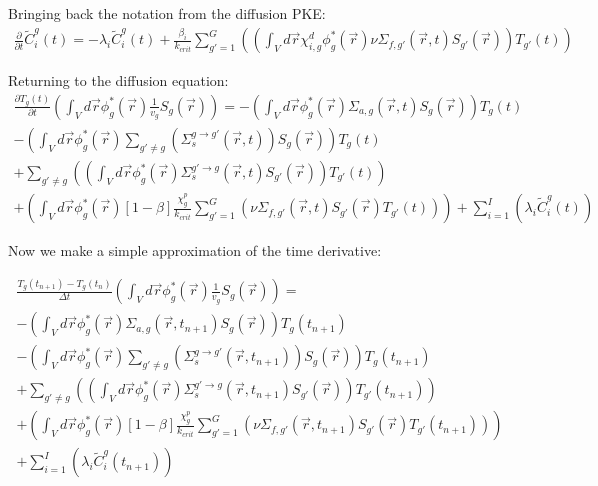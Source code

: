 \documentclass[12pt]{report}
\begin{document}
	Bringing back the notation from the diffusion PKE:
	\begin{eqnarray}
	\frac{\partial}{\partial t} \tilde{C}_i^g(t) = -\lambda_i \tilde{C}_i^g(t) + \frac{\beta_i}{k_{crit}} \sum_{g'=1}^{G}\left( \left( \int_{V} d\vec{r} \chi^d_{i,g} \phi_g^*(\vec{r}) \nu \Sigma_{f,g'}(\vec{r},t) S_{g'}(\vec{r}) \right) T_{g'}(t) \right)
	\end{eqnarray}
	
	Returning to the diffusion equation:
	\begin{eqnarray} 
	\frac{\partial T_g(t)}{\partial t} \left( \int_{V} d\vec{r} \phi_g^*(\vec{r}) \frac{1}{v_g}  S_g(\vec{r}) \right) = - \left( \int_{V} d\vec{r} \phi_g^*(\vec{r}) \Sigma_{a,g}(\vec{r},t)  S_g(\vec{r}) \right) T_g(t) \nonumber \\
	- \left( \int_{V} d\vec{r} \phi_g^*(\vec{r}) \sum_{g'\neq g} \left( \Sigma_{s}^{g\rightarrow g'}(\vec{r},t) \right)  S_g(\vec{r}) \right) T_g(t) \nonumber \\
	+ \sum_{g'\neq g} \left( \left( \int_{V}  d\vec{r} \phi_g^*(\vec{r})  \Sigma_{s}^{g'\rightarrow g} (\vec{r},t)  S_{g'}(\vec{r}) \right) T_{g'}(t) 
	\right) \nonumber \\
	+ \left( \int_{V} d\vec{r} \phi_g^*(\vec{r}) \left[ 1- \beta \right] \frac{\chi_g^p}{k_{crit}} \sum_{g'=1}^{G} \left( \nu \Sigma_{f,g'}(\vec{r},t) S_{g'}(\vec{r}) T_{g'}(t) \right) \right) +
	\sum_{i=1}^{I} \left( \lambda_i \tilde{C}_i^g(t) \right)
	\end{eqnarray}
	
	Now we make a simple approximation of the time derivative:
	
	\begin{eqnarray} 
	\frac{ T_g(t_{n+1}) - T_g(t_{n})}{\Delta t} \left( \int_{V} d\vec{r} \phi_g^*(\vec{r}) \frac{1}{v_g}  S_g(\vec{r}) \right) = \nonumber \\
	 - \left( \int_{V} d\vec{r} \phi_g^*(\vec{r}) \Sigma_{a,g}(\vec{r},t_{n+1})  S_g(\vec{r}) \right) T_g(t_{n+1}) \nonumber \\
	- \left( \int_{V} d\vec{r} \phi_g^*(\vec{r}) \sum_{g'\neq g} \left( \Sigma_{s}^{g\rightarrow g'}(\vec{r},t_{n+1}) \right)  S_g(\vec{r}) \right) T_g(t_{n+1}) \nonumber \\
	+ \sum_{g'\neq g} \left( \left( \int_{V}  d\vec{r} \phi_g^*(\vec{r})  \Sigma_{s}^{g'\rightarrow g} (\vec{r},t_{n+1})  S_{g'}(\vec{r}) \right) T_{g'}(t_{n+1}) 
	\right) \nonumber \\
	+ \left( \int_{V} d\vec{r} \phi_g^*(\vec{r}) \left[ 1- \beta \right] \frac{\chi_g^p}{k_{crit}} \sum_{g'=1}^{G} \left( \nu \Sigma_{f,g'}(\vec{r},t_{n+1}) S_{g'}(\vec{r}) T_{g'}(t_{n+1}) \right) \right) \nonumber \\
	 + \sum_{i=1}^{I} \left( \lambda_i \tilde{C}_i^g(t_{n+1}) \right)
	\end{eqnarray}
	
\end{document}
